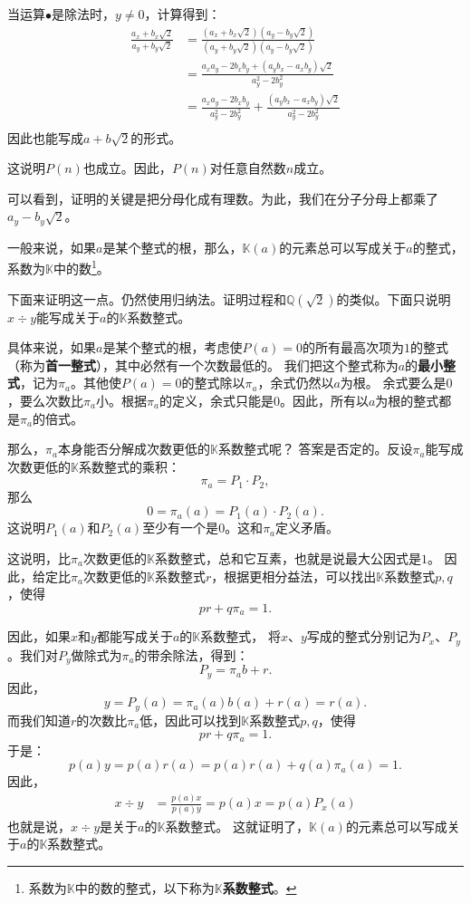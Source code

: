 \documentclass[12pt,UTF8,fontset=none]{ctexbook}
\begin{document}
当运算$\bullet$是除法时，$y\neq 0$，计算得到：
\begin{align*}
    \frac{a_x + b_x\sqrt{2}}{a_y + b_y\sqrt{2}} &=  \frac{(a_x + b_x\sqrt{2})(a_y - b_y\sqrt{2})}{(a_y + b_y\sqrt{2})(a_y - b_y\sqrt{2})} \\
    &= \frac{a_xa_y - 2b_xb_y + (a_yb_x - a_xb_y)\sqrt{2}}{a_y^2 - 2b_y^2} \\
    &= \frac{a_xa_y - 2b_xb_y}{a_y^2 - 2b_y^2} + \frac{(a_yb_x - a_xb_y)\sqrt{2}}{a_y^2 - 2b_y^2}\\
\end{align*}
因此也能写成$a + b\sqrt{2}$的形式。

这说明$P(n)$也成立。因此，$P(n)$对任意自然数$n$成立。

可以看到，证明的关键是把分母化成有理数。为此，我们在分子分母上都乘了$a_y - b_y\sqrt{2}$。

一般来说，如果$a$是某个整式的根，那么，$\mathbb{K}(a)$的元素总可以写成关于$a$的整式，
系数为$\mathbb{K}$中的数\footnote{系数为$\mathbb{K}$中的数的整式，以下称为$\mathbb{K}$\textbf{系数整式}。}。

下面来证明这一点。仍然使用归纳法。证明过程和$\mathbb{Q}(\sqrt{2})$的类似。下面只说明$x \div y$能写成关于$a$的$\mathbb{K}$系数整式。

具体来说，如果$a$是某个整式的根，考虑使$P(a) = 0$的所有最高次项为$1$的整式（称为\textbf{首一整式}），其中必然有一个次数最低的。
我们把这个整式称为$a$的\textbf{最小整式}，记为$\pi_a$。其他使$P(a) = 0$的整式除以$\pi_a$，余式仍然以$a$为根。
余式要么是$0$，要么次数比$\pi_a$小。根据$\pi_a$的定义，余式只能是$0$。因此，所有以$a$为根的整式都是$\pi_a$的倍式。

那么，$\pi_a$本身能否分解成次数更低的$\mathbb{K}$系数整式呢？
答案是否定的。反设$\pi_a$能写成次数更低的$\mathbb{K}$系数整式的乘积：
$$\pi_a = P_1 \cdot P_2,$$
那么
$$ 0 = \pi_a(a) = P_1(a) \cdot P_2(a).$$
这说明$P_1(a)$和$P_2(a)$至少有一个是$0$。这和$\pi_a$定义矛盾。

这说明，比$\pi_a$次数更低的$\mathbb{K}$系数整式，总和它互素，也就是说最大公因式是$1$。
因此，给定比$\pi_a$次数更低的$\mathbb{K}$系数整式$r$，根据更相分益法，可以找出$\mathbb{K}$系数整式$p,q$，使得
$$ pr + q\pi_a = 1.$$

因此，如果$x$和$y$都能写成关于$a$的$\mathbb{K}$系数整式，
将$x$、$y$写成的整式分别记为$P_x$、$P_y$。我们对$P_y$做除式为$\pi_a$的带余除法，得到：
$$ P_y = \pi_a b + r.$$
因此，
$$ y = P_y(a) = \pi_a(a) b(a) + r(a) = r(a). $$
而我们知道$r$的次数比$\pi_a$低，因此可以找到$\mathbb{K}$系数整式$p,q$，使得
$$ pr + q\pi_a = 1.$$
于是：
$$ p(a) y = p(a)r(a) = p(a)r(a) + q(a)\pi_a(a) = 1. $$
因此，
\begin{align*}
    x \div y &= \frac{p(a)x}{p(a)y} = p(a)x = p(a)P_x(a)
\end{align*}
也就是说，$x \div y$是关于$a$的$\mathbb{K}$系数整式。
这就证明了，$\mathbb{K}(a)$的元素总可以写成关于$a$的$\mathbb{K}$系数整式。
\end{document}
